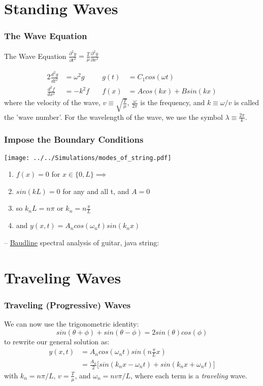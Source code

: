 \documentclass[pdf, handout, hideothersubsections]{beamer}
\begin{document}
\section{Standing Waves}
\begin{frame}
\frametitle{The Wave Equation}
\begin{block}{The Wave Equation}
\centering
$ \frac{\partial^2 y}{\partial t^2} = \frac{T}{\mu} \frac{\partial^2 y}{\partial x^2}$
\end{block}
\pause
\begin{alignat}{2}
\frac{d^2 g}{dt^2} &= \omega^2 g  &\quad g(t) &= C_1 cos(\omega t) \\
\frac{d^2 f}{dx^2} &= -k^2 f &\quad f(x) &= A cos(k x) + B
sin(k x) 
\end{alignat}
\pause
where the velocity of the wave, $v \equiv \sqrt{\frac{T}{\mu}}$,
$\frac{\omega}{2 \pi}$ is the frequency, and $k \equiv \omega / v$ is
called the 'wave number'. For the wavelength of the wave, we use the
symbol $\lambda \equiv \frac{2 \pi}{k}$.
\end{frame}

\begin{frame}
\frametitle{Impose the Boundary Conditions}
\begin{centering}
\texttt{[image: ../../Simulations/modes\_of\_string.pdf]}
\end{centering}
    \begin{enumerate}
    \item $f(x) = 0$ for $x \in \{0, L\} \implies$
      \pause
    \item $sin(k L) = 0$ for any and all t, and $A = 0$
      \pause
    \item so $k_n L = n \pi$ or $k_n = n \frac{\pi}{L}$
      \pause
    \item and $y(x, t) = A_n cos(\omega_n t) sin(k_n x)$
    \end{enumerate}
-- \href{http://www.baudline.com/}{Baudline} spectral analysis of
guitar, java string:
\end{frame}



\section{Traveling Waves}
\begin{frame}
\frametitle{Traveling (Progressive) Waves}
\pause
We can now use the trigonometric identity:
\begin{equation}
sin(\theta + \phi) + sin(\theta - \phi) = 2 sin(\theta) cos(\phi) 
\end{equation} \pause
to rewrite our general solution as:
\begin{align}
y(x, t) &= A_n cos(\omega_n t) sin(n \frac{\pi}{L} x) \\
        &= \frac{A_n}{2} \bigg[sin(k_n x - \omega_n t)  + sin(k_n x + \omega_n t)\bigg]
\label{eq:genstand}
\end{align}
\pause
with $k_n = n \pi/L$, $v = \frac{T}{\mu}$, and $\omega_n = n v \pi/L$,
\pause
where each term is a \emph{traveling} wave. \\


\end{frame}
\end{document}
